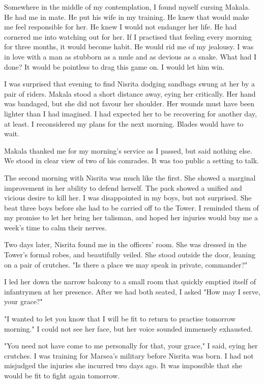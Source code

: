 \documentclass{article}
\begin{document}
Somewhere in the middle of my contemplation, I found myself cursing Makala. He had me in mate. He put his wife in my training. He knew that would make me feel responsible for her. He knew I would not endanger her life. He had cornered me into watching out for her. If I practised that feeling every morning for three months, it would become habit. He would rid me of my jealousy. I was in love with a man as stubborn as a mule and as devious as a snake. What had I done? It would be pointless to drag this game on. I would let him win.

I was surprised that evening to find Nisrita dodging sandbags swung at her by a pair of riders. Makala stood a short distance away, eying her critically. Her hand was bandaged, but she did not favour her shoulder. Her wounds must have been lighter than I had imagined. I had expected her to be recovering for another day, at least. I reconsidered my plans for the next morning. Blades would have to wait.

Makala thanked me for my morning's service as I passed, but said nothing else. We stood in clear view of two of his comrades. It was too public a setting to talk. 

The second morning with Nisrita was much like the first. She showed a marginal improvement in her ability to defend herself. The pack showed a unified and vicious desire to kill her. I was disappointed in my boys, but not surprised. She beat three boys before she had to be carried off to the Tower. I reminded them of my promise to let her bring her talisman, and hoped her injuries would buy me a week's time to calm their nerves.

Two days later, Nisrita found me in the officers' room. She was dressed in the Tower's formal robes, and beautifully veiled. She stood outside the door, leaning on a pair of crutches. "Is there a place we may speak in private, commander?" 

I led her down the narrow balcony to a small room that quickly emptied itself of infantrymen at her presence. After we had both seated, I asked "How may I serve, your grace?"

"I wanted to let you know that I will be fit to return to practise tomorrow morning." I could not see her face, but her voice sounded immensely exhausted.

"You need not have come to me personally for that, your grace," I said, eying her crutches. I was training for Marsea's military before Nisrita was born. I had not misjudged the injuries she incurred two days ago. It was impossible that she would be fit to fight again tomorrow.
\end{document}
